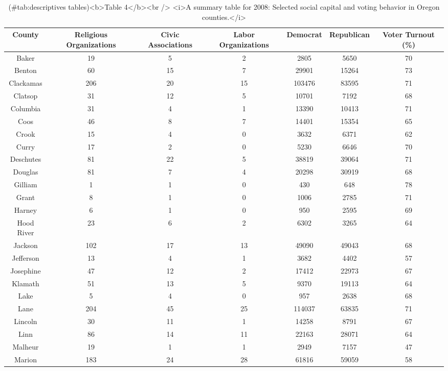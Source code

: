 \documentclass[
  english,
  man]{apa6}
\begin{document}
\begin{table}

\caption{(\#tab:descriptives tables)<b>Table 4</b><br /> <i>A summary table for 2008: Selected social capital and voting behavior in Oregon counties.</i>}
\centering
\begin{tabular}[t]{c|c|c|c|c|c|c}
\hline
County & Religious Organizations & Civic Associations & Labor Organizations & Democrat & Republican & Voter Turnout (\%)\\
\hline
Baker & 19 & 5 & 2 & 2805 & 5650 & 70\\
\hline
Benton & 60 & 15 & 7 & 29901 & 15264 & 73\\
\hline
Clackamas & 206 & 20 & 15 & 103476 & 83595 & 71\\
\hline
Clatsop & 31 & 12 & 5 & 10701 & 7192 & 68\\
\hline
Columbia & 31 & 4 & 1 & 13390 & 10413 & 71\\
\hline
Coos & 46 & 8 & 7 & 14401 & 15354 & 65\\
\hline
Crook & 15 & 4 & 0 & 3632 & 6371 & 62\\
\hline
Curry & 17 & 2 & 0 & 5230 & 6646 & 70\\
\hline
Deschutes & 81 & 22 & 5 & 38819 & 39064 & 71\\
\hline
Douglas & 81 & 7 & 4 & 20298 & 30919 & 68\\
\hline
Gilliam & 1 & 1 & 0 & 430 & 648 & 78\\
\hline
Grant & 8 & 1 & 0 & 1006 & 2785 & 71\\
\hline
Harney & 6 & 1 & 0 & 950 & 2595 & 69\\
\hline
Hood River & 23 & 6 & 2 & 6302 & 3265 & 64\\
\hline
Jackson & 102 & 17 & 13 & 49090 & 49043 & 68\\
\hline
Jefferson & 13 & 4 & 1 & 3682 & 4402 & 57\\
\hline
Josephine & 47 & 12 & 2 & 17412 & 22973 & 67\\
\hline
Klamath & 51 & 13 & 5 & 9370 & 19113 & 64\\
\hline
Lake & 5 & 4 & 0 & 957 & 2638 & 68\\
\hline
Lane & 204 & 45 & 25 & 114037 & 63835 & 71\\
\hline
Lincoln & 30 & 11 & 1 & 14258 & 8791 & 67\\
\hline
Linn & 86 & 14 & 11 & 22163 & 28071 & 64\\
\hline
Malheur & 19 & 1 & 1 & 2949 & 7157 & 47\\
\hline
Marion & 183 & 24 & 28 & 61816 & 59059 & 58\\

\end{tabular}
\end{table}
\end{document}

